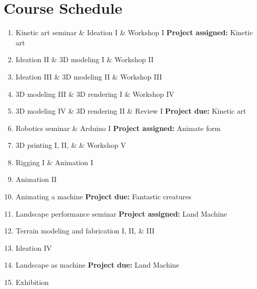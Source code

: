 \documentclass[11pt,article,oneside]{memoir}
\begin{document}
\clearpage

\section{Course Schedule}

\begin{enumerate}
%
\item Kinetic art seminar \& Ideation I \& Workshop I \textbf{Project assigned:} Kinetic art %
\item Ideation II \& 3D modeling I \& Workshop II%
\item Ideation III \& 3D modeling II \& Workshop III
\item 3D modeling III \& 3D rendering I \& Workshop IV
\item 3D modeling IV \& 3D rendering II \& Review I \textbf{Project due:} Kinetic art
%
\item Robotics seminar \& Arduino I  \textbf{Project assigned:} Animate form
\item 3D printing I, II, \& \& Workshop V
\item Rigging I \& Animation I
\item Animation II
\item Animating a machine \textbf{Project due:} Fantastic creatures
%
\item Landscape performance seminar \textbf{Project assigned:} Land Machine
\item Terrain modeling and fabrication I, II, \& III %
\item Ideation IV
\item Landscape as machine \textbf{Project due:} Land Machine
%
\item Exhibition
%
\end{enumerate}


\end{document}
